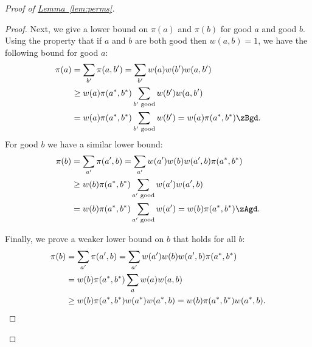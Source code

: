 \documentclass[11pt]{article}
\providecommand{\expref}[2]{\texorpdfstring{\hyperref[#2]{#1~\ref{#2}}}{#1~\ref{#2}}}
\begin{document}
\begin{proof}[Proof of \expref{Lemma}{lem:perms}]
\begin{proof}
 Next, we give a lower bound on $\pi(a)$ and 
$\pi(b)$ for good $a$ and good $b$.  Using the property that if $a$ and 
$b$ are both good then $w(a,b) = 1$, we have the following bound for 
good $a$:
\begin{align*}
\pi(a) &=  \sum_{b'}\pi(a,b') = \sum_{b'} w(a)w(b') w(a,b')\\
&\geq w(a) \pi(a^*,b^*) \sum_{b' \text{ good}} w(b')w(a,b')\\
&= w(a) \pi(a^*,b^*) \sum_{b' \text{ good}} w(b') = w(a) \pi(a^*,b^*)\zBgd.\\
\end{align*}
\noindent For good $b$ we have a similar lower bound: 
\begin{align*}
\pi(b) &=  \sum_{a'}\pi(a',b) = \sum_{a'} w(a')w(b) w(a',b)\pi(a^*,b^*)\\
&\geq w(b) \pi(a^*,b^*) \sum_{a' \text{ good}} w(a')w(a',b)\\
&= w(b) \pi(a^*,b^*) \sum_{a' \text{ good}} w(a') = w(b) \pi(a^*,b^*)\zAgd.\\
\end{align*}



 Finally, we prove a weaker lower bound on $b$ that 
holds for all $b$:
\begin{align*}
\pi(b) &= \sum_{a'}\pi(a',b) = \sum_{a'} w(a')w(b) w(a',b)\pi(a^*,b^*)\\
&= w(b)\pi(a^*,b^*) \sum_a w(a)w(a,b)\\
&\geq w(b)\pi(a^*,b^*) w(a^*)w(a^*,b) = w(b)\pi(a^*,b^*)w(a^*,b).\qedhere
\end{align*}
\end{proof}


\end{proof}
\end{document}
